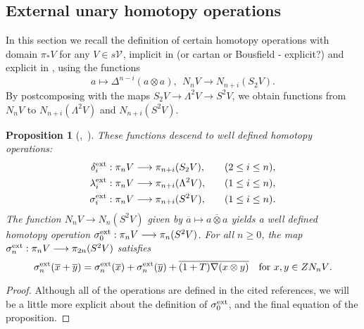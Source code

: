 \documentclass[11pt]{amsart}
\theoremstyle{plain}
\newtheorem{prop}[thm]{Proposition}
\theoremstyle{definition}
\let\oldphi\phi
\let\phi\varphi
\renewcommand{\to}{\longrightarrow}
\newcommand{\calV}{\mathcal{V}}
\theoremstyle{plain}
\newcommand{\vect}[2]{\calV^{#1}_{#2}}
\newcommand{\DeltaUp}{\Delta}%
\newcommand{\Nabla}{\nabla}
\begin{document}
\begin{Constructing (co)homotopy operations}
\subsection{External unary homotopy operations}
In this section we recall the definition of certain homotopy operations with domain $\pi_*V$ for any $V\in s\vect{}{}$, implicit in \cite[\S4]{DwyerHtpyOpsSimpComAlg.pdf} (or cartan or Bousfield - explicit?) and explicit in 
\cite[\S3]{MR1089001}, using the functions
\[a \mapsto \DeltaUp^{n-i}(a\otimes a),\ \ N_nV \to N_{n+i}(S_2V).\]
By postcomposing with the maps $S_2V\to \Lambda^{2}V\to S^2V$, we obtain functions from $N_nV$ to $N_{n+i}(\Lambda^2V)$ and $N_{n+i}(S^2V)$.
\begin{prop}[{\cite[Lemma 4.1]{DwyerHtpyOpsSimpComAlg.pdf},\ \cite[\S3]{MR1089001}}] \label{extUnaryHomotOps}
These functions descend to  well defined homotopy operations:
\begin{alignat*}{2}
\delta_i^\textup{ext}:\pi_nV&\to \pi_{n+i}(S_2V),&\quad&(2\leq i\leq n),\\
\lambda_i^\textup{ext}:\pi_nV&\to \pi_{n+i}(\Lambda^2V),&\quad&(1\leq i\leq n),\\
\sigma_i^\textup{ext}:\pi_nV&\to \pi_{n+i}(S^2V),&\quad&(1\leq i\leq n).
\end{alignat*}
The function $N_nV \to N_{n}(S^2V)$ given by $\overline{a}\mapsto \overline{a\otimes a}$ yields a well defined homotopy operation $\sigma_0^\textup{ext}:\pi_nV\to \pi_{n}(S^2V)$. 
For all $n\geq0$, the map $\sigma_n^\textup{ext}:\pi_nV\to\pi_{2n}(S^2V)$ satisfies
\[\sigma_n^\textup{ext}(\overline{x}+\overline{y})=\sigma_n^\textup{ext}(\overline{x})+\sigma_n^\textup{ext}(\overline{y})+\overline{(1+T)\Nabla(x\otimes y)}\quad\text{for $x,y\in ZN_nV$}.\]
\end{prop}
\begin{proof}
Although all of the operations  are defined in the cited references, we will be a little more explicit about the definition of $\sigma^\textup{ext}_0$, and the final equation of the proposition.


\end{proof}
\end{Constructing (co)homotopy operations}
\end{document}
